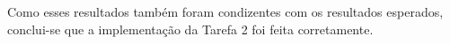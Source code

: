 \documentclass[conference]{IEEEtran}
\begin{document}


	Como esses resultados também foram condizentes com os resultados esperados, conclui-se que a implementação da Tarefa 2 foi feita corretamente.
	



\end{document}

